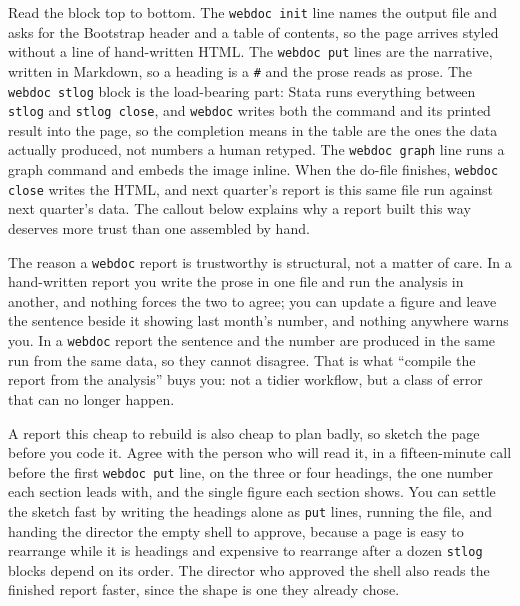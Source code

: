 \documentclass[
    a4paper,
    fontsize=10pt,
    twoside=true,
    numbers=noenddot,
]{kaobook}
\newenvironment{vizcallout}[1][Visualization to build]{%
    \begin{vizbox}[frametitle={#1}]%
}{%
    \end{vizbox}%
}
\begin{document}
Read the block top to bottom. The \texttt{webdoc init} line names the output file and asks for the Bootstrap header and a table of contents, so the page arrives styled without a line of hand-written HTML. The \texttt{webdoc put} lines are the narrative, written in Markdown, so a heading is a \texttt{\#} and the prose reads as prose. The \texttt{webdoc stlog} block is the load-bearing part: Stata runs everything between \texttt{stlog} and \texttt{stlog close}, and \texttt{webdoc} writes both the command and its printed result into the page, so the completion means in the table are the ones the data actually produced, not numbers a human retyped. The \texttt{webdoc graph} line runs a graph command and embeds the image inline. When the do-file finishes, \texttt{webdoc close} writes the HTML, and next quarter's report is this same file run against next quarter's data. The callout below explains why a report built this way deserves more trust than one assembled by hand.

\begin{vizcallout}[Why the prose and the numbers cannot disagree]
The reason a \texttt{webdoc} report is trustworthy is structural, not a matter of care. In a hand-written report you write the prose in one file and run the analysis in another, and nothing forces the two to agree; you can update a figure and leave the sentence beside it showing last month's number, and nothing anywhere warns you. In a \texttt{webdoc} report the sentence and the number are produced in the same run from the same data, so they cannot disagree. That is what \enquote{compile the report from the analysis} buys you: not a tidier workflow, but a class of error that can no longer happen.
\end{vizcallout}

A report this cheap to rebuild is also cheap to plan badly, so sketch the page before you code it. Agree with the person who will read it, in a fifteen-minute call before the first \texttt{webdoc put} line, on the three or four headings, the one number each section leads with, and the single figure each section shows. You can settle the sketch fast by writing the headings alone as \texttt{put} lines, running the file, and handing the director the empty shell to approve, because a page is easy to rearrange while it is headings and expensive to rearrange after a dozen \texttt{stlog} blocks depend on its order. The director who approved the shell also reads the finished report faster, since the shape is one they already chose.
\end{document}
